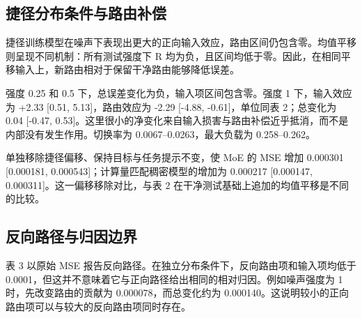 \documentclass[10pt,letterpaper]{article}
\begin{document}
\subsection{捷径分布条件与路由补偿}

捷径训练模型在噪声下表现出更大的正向输入效应，路由区间仍包含零。均值平移则呈现不同机制：所有测试强度下 R 均为负，且区间均低于零。因此，在相同平移输入上，新路由相对于保留干净路由能够降低误差。


强度 0.25 和 0.5 下，总误差变化为负，输入项区间包含零。强度 1 下，输入效应为 +2.33 [0.51, 5.13]，路由效应为 -2.29 [-4.88, -0.61]，单位同表 2；总变化为 0.04 [-0.47, 0.53]。这里很小的净变化来自输入损害与路由补偿近乎抵消，而不是内部没有发生作用。切换率为 0.0067--0.0263，最大负载为 0.258--0.262。


单独移除捷径偏移、保持目标与任务提示不变，使 MoE 的 MSE 增加 0.000301 [0.000181, 0.000543]；计算量匹配稠密模型的增加为 0.000217 [0.000147, 0.000311]。这一偏移移除对比，与表 2 在干净测试基础上追加的均值平移是不同的比较。


\subsection{反向路径与归因边界}

表 3 以原始 MSE 报告反向路径。在独立分布条件下，反向路由项和输入项均低于 0.0001，但这并不意味着它与正向路径给出相同的相对归因。例如噪声强度为 1 时，先改变路由的贡献为 0.000078，而总变化约为 0.000140。这说明较小的正向路由项可以与较大的反向路由项同时存在。


\begin{table}[!htbp]
\centering
\caption{强度 1 下的反向路径均值，单位为原始 MSE。路由项先在干净专家输入上改变路由，输入项再在该路由下改变专家输入。}
\label{tab:results3}
\small
\setlength{\tabcolsep}{4pt}
\renewcommand{\arraystretch}{1.1}
\ifdim\wd\reporttablebox>\linewidth
\resizebox{\linewidth}{!}{\usebox{\reporttablebox}}
\else\usebox{\reporttablebox}\fi
\end{table}
\end{document}
